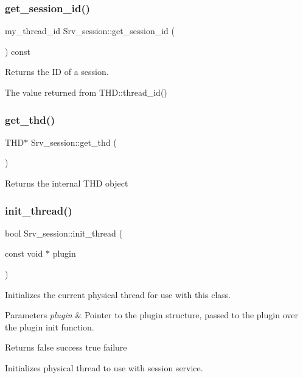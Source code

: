 \subsubsection{\texorpdfstring{get\+\_\+session\+\_\+id()}{get\_session\_id()}}
{\footnotesize\ttfamily my\+\_\+thread\+\_\+id Srv\+\_\+session\+::get\+\_\+session\+\_\+id (\begin{DoxyParamCaption}{ }\end{DoxyParamCaption}) const\hspace{0.3cm}{\ttfamily [inline]}}

Returns the ID of a session.

The value returned from T\+H\+D\+::thread\+\_\+id() \mbox{\label{classSrv__session_afeee05328ba7f7be16a12c5cb853945c}} 
\subsubsection{\texorpdfstring{get\+\_\+thd()}{get\_thd()}}
{\footnotesize\ttfamily T\+HD$\ast$ Srv\+\_\+session\+::get\+\_\+thd (\begin{DoxyParamCaption}{ }\end{DoxyParamCaption})\hspace{0.3cm}{\ttfamily [inline]}}

Returns the internal T\+HD object \mbox{\label{classSrv__session_a94790b19dd27e8bd99c58ac74ff33280}} 
\subsubsection{\texorpdfstring{init\+\_\+thread()}{init\_thread()}}
{\footnotesize\ttfamily bool Srv\+\_\+session\+::init\+\_\+thread (\begin{DoxyParamCaption}\item[{const void $\ast$}]{plugin }\end{DoxyParamCaption})\hspace{0.3cm}{\ttfamily [static]}}

Initializes the current physical thread for use with this class.


\begin{DoxyParams}{Parameters}
{\em plugin} & Pointer to the plugin structure, passed to the plugin over the plugin init function.\\
\hline
\end{DoxyParams}
\begin{DoxyReturn}{Returns}
false success true failure
\end{DoxyReturn}
Initializes physical thread to use with session service.


